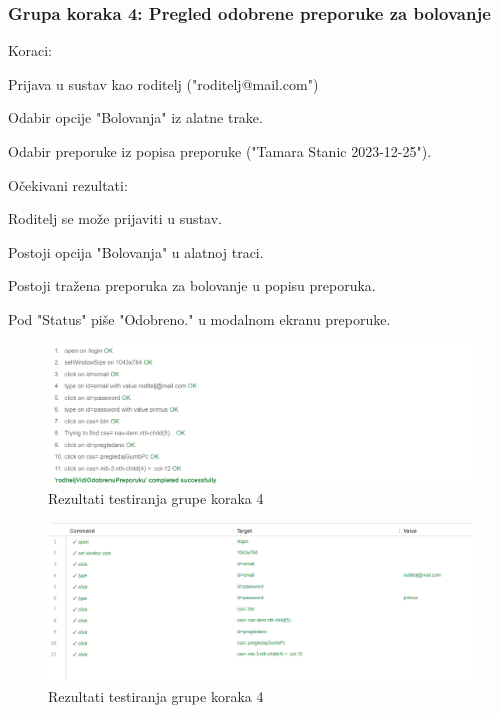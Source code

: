 			 \subsubsection*{Grupa koraka 4: Pregled odobrene preporuke za bolovanje}
			 Koraci:
			 \begin{packed_enum}
				\item Prijava u sustav kao roditelj ("roditelj@mail.com")
				\item Odabir opcije "Bolovanja" iz alatne trake.
				\item Odabir preporuke iz popisa preporuke ("Tamara Stanic 2023-12-25").
			 \end{packed_enum}
			 Očekivani rezultati:
			 \begin{packed_enum}
				\item Roditelj se može prijaviti u sustav.
				\item Postoji opcija "Bolovanja" u alatnoj traci.
				\item Postoji tražena preporuka za bolovanje u popisu preporuka.
				\item Pod "Status" piše "Odobreno." u modalnom ekranu preporuke.
			 \end{packed_enum}
			
			\begin{figure}[H]
				\includegraphics[width=\textwidth]{slike/selenium4.1.png} 
				\caption{Rezultati testiranja grupe koraka 4} 
			\end{figure}

			\begin{figure}[H]
				\includegraphics[width=\textwidth]{slike/selenium4.2.png} 
				\caption{Rezultati testiranja grupe koraka 4} 
			\end{figure}

